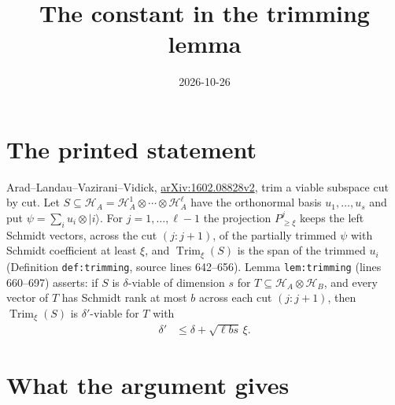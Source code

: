 \documentclass{article}
\title{The constant in the trimming lemma}
\author{}
\date{2026-10-26}
\begin{document}
\maketitle
{}

\section{The printed statement}

Arad--Landau--Vazirani--Vidick,
\href{https://arxiv.org/abs/1602.08828}{arXiv:1602.08828v2}, trim a viable
subspace cut by cut. Let $S\subseteq\mathcal H_A=\mathcal H_A^1\otimes\cdots
\otimes\mathcal H_A^\ell$ have the orthonormal basis $u_1,\dots,u_s$ and put
$\psi=\sum_iu_i\otimes|i\rangle$. For $j=1,\dots,\ell-1$ the projection
$P^j_{\ge\xi}$ keeps the left Schmidt vectors, across the cut $(j:j+1)$, of
the partially trimmed $\psi$ with Schmidt coefficient at least $\xi$, and
$\operatorname{Trim}_\xi(S)$ is the span of the trimmed $u_i$ (Definition
\texttt{def:trimming}, source lines 642--656). Lemma \texttt{lem:trimming}
(lines 660--697) asserts: if $S$ is $\delta$-viable of dimension $s$ for
$T\subseteq\mathcal H_A\otimes\mathcal H_B$, and every vector of $T$ has
Schmidt rank at most $b$ across each cut $(j:j+1)$, then
$\operatorname{Trim}_\xi(S)$ is $\delta'$-viable for $T$ with
\begin{align}
    \delta'&\le\delta+\sqrt{\ell bs}\,\xi .
    \label{eq:alvv_trim_printed}
\end{align}

\section{What the argument gives}
\end{document}
